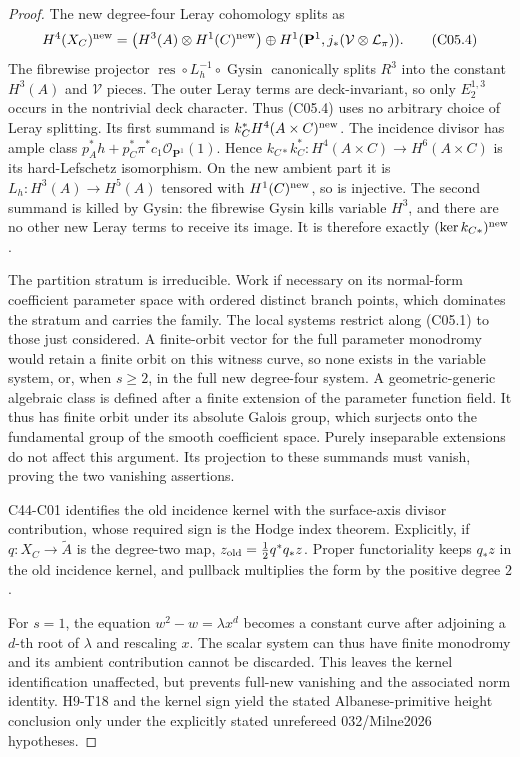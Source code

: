 \documentclass[11pt]{article}
\theoremstyle{remark}\newtheorem{remark}[theorem]{Remark}
\begin{document}
\begin{proof}
The new degree-four Leray cohomology splits as
\[
 H^4(X_C)^{\rm new}
 =\bigl(H^3(A)\otimes H^1(C)^{\rm new}\bigr)
 \oplus H^1(\mathbf P^1,j_*(\mathcal V\otimes\mathcal L_\pi)).
                                                            \tag{C05.4}
\]
The fibrewise projector
\(\operatorname{res}\circ L_h^{-1}\circ\operatorname{Gysin}\)
canonically splits \(R^3\) into the constant \(H^3(A)\) and
\(\mathcal V\) pieces. The outer Leray terms are deck-invariant,
so only \(E_2^{1,3}\) occurs in the nontrivial deck character.
Thus (C05.4) uses no arbitrary choice of Leray splitting.
Its first summand is \(k_C^*H^4(A\times C)^{\rm new}\).
The incidence divisor has ample class
\(p_A^*h+p_C^*\pi^*c_1\mathcal O_{\mathbf P^1}(1)\).
Hence \(k_{C*}k_C^*:H^4(A\times C)\to H^6(A\times C)\)
is its hard-Lefschetz isomorphism. On the new ambient part it is
\(L_h:H^3(A)\to H^5(A)\) tensored with \(H^1(C)^{\rm new}\),
so is injective. The second summand is killed by Gysin:
the fibrewise Gysin kills variable \(H^3\), and there are no
other new Leray terms to receive its image. It is therefore
exactly \((\ker k_{C*})^{\rm new}\).

The partition stratum is irreducible. Work if necessary on its
normal-form coefficient parameter space with ordered distinct
branch points, which dominates the stratum and carries the family.
The local systems restrict along (C05.1) to those just considered.
A finite-orbit vector for the full parameter monodromy would retain
a finite orbit on this witness curve, so none exists in the variable
system, or, when \(s\ge2\), in the full new degree-four system.
A geometric-generic algebraic class is defined after a finite
extension of the parameter function field. It thus has finite orbit
under its absolute Galois group, which surjects onto the fundamental
group of the smooth coefficient space. Purely inseparable extensions
do not affect this argument. Its projection to these summands must
vanish, proving the two vanishing assertions.

C44-C01 identifies the old incidence kernel with the surface-axis
divisor contribution, whose required sign is the Hodge index theorem.
Explicitly, if \(q:X_C\to\widetilde A\) is the degree-two map,
\(z_{\rm old}=\frac12q^*q_*z\). Proper functoriality keeps \(q_*z\)
in the old incidence kernel, and pullback multiplies the form by
the positive degree \(2\).

For \(s=1\), the equation \(w^2-w=\lambda x^d\) becomes a constant
curve after adjoining a \(d\)-th root of \(\lambda\) and rescaling
\(x\). The scalar system can thus have finite monodromy and its
ambient contribution cannot be discarded. This leaves the kernel
identification unaffected, but prevents full-new vanishing and
the associated norm identity. H9-T18 and the kernel sign yield
the stated Albanese-primitive height conclusion only under the
explicitly stated unrefereed 032/Milne2026 hypotheses.
\end{proof}
\end{document}
